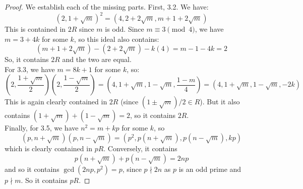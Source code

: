 \begin{proof}
	We establish each of the missing parts. First, 3.2. We have:
	\[ (2,1+\sqrt{m})^2 = (4,2+2\sqrt{m},m+1+2\sqrt{m}) \]
	This is contained in $2R$ since $m$ is odd. Since $m \equiv 3 \pmod{4}$, we have $m = 3+4k$ for some $k$, so this ideal also contains:
	\[ (m+1+2\sqrt{m})-(2+2\sqrt{m})-k(4) = m-1-4k = 2 \]
	So, it contains $2R$ and the two are equal. \\
	
	For 3.3, we have $m = 8k+1$ for some $k$, so:
	\[ \left(2,\frac{1+\sqrt{m}}{2}\right)\left(2,\frac{1-\sqrt{m}}{2}\right) = \left(4,1+\sqrt{m},1-\sqrt{m},\frac{1-m}{4}\right) = (4,1+\sqrt{m},1-\sqrt{m},-2k) \]
	This is again clearly contained in $2R$ (since $(1 \pm \sqrt{m})/2 \in R$). But it also contains $(1+\sqrt{m})+(1-\sqrt{m}) = 2$, so it contains $2R$. \\
	
	Finally, for 3.5, we have $n^2 = m + kp$ for some $k$, so
	\[ (p, n+\sqrt{m})(p, n-\sqrt{m}) = (p^2, p(n+\sqrt{m}), p(n-\sqrt{m}), kp) \]
	which is clearly contained in $pR$. Conversely, it contains
	\[ p(n+\sqrt{m}) + p(n-\sqrt{m}) = 2np \]
	and so it contains $\gcd(2np,p^2) = p$, since $p \nmid 2n$ as $p$ is an odd prime and $p \nmid m$. So it contains $pR$.
\end{proof}
